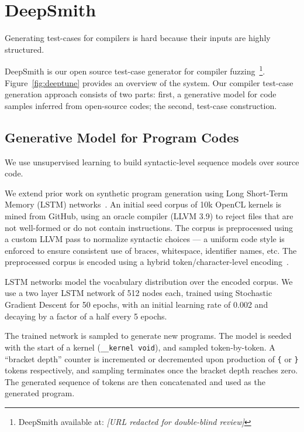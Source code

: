 \section{DeepSmith}

Generating test-cases for compilers is hard because their inputs are highly structured.

DeepSmith is our open source test-case generator for compiler fuzzing~\footnote{DeepSmith available at: \emph{[URL redacted for double-blind review]}}. Figure~\ref{fig:deeptune} provides an overview of the system. Our compiler test-case generation approach consists of two parts: first, a generative model for code samples inferred from open-source codes; the second, test-case construction.


\subsection{Generative Model for Program Codes}

We use unsupervised learning to build syntactic-level sequence models over source code.

We extend prior work on synthetic program generation using Long Short-Term Memory (LSTM) networks~\cite{Cummins2017a}. An initial seed corpus of 10k OpenCL kernels is mined from GitHub, using an oracle compiler (LLVM 3.9) to reject files that are not well-formed or do not contain instructions. The corpus is preprocessed using a custom LLVM pass to normalize syntactic choices --- a uniform code style is enforced to ensure consistent use of braces, whitespace, identifier names, etc. The preprocessed corpus is encoded using a hybrid token/character-level encoding~\cite{Cummins2017b}. 

LSTM networks model the vocabulary distribution over the encoded corpus. We use a two layer LSTM network of 512 nodes each, trained using Stochastic Gradient Descent for 50 epochs, with an initial learning rate of 0.002 and decaying by a factor of a half every 5 epochs. %

The trained network is sampled to generate new programs. The model is seeded with the start of a kernel (\texttt{\_\_kernel void}), and sampled token-by-token. A ``bracket depth'' counter is incremented or decremented upon production of \texttt{\{} or \texttt{\}} tokens respectively, and sampling terminates once the bracket depth reaches zero. The generated sequence of tokens are then concatenated and used as the generated program.


